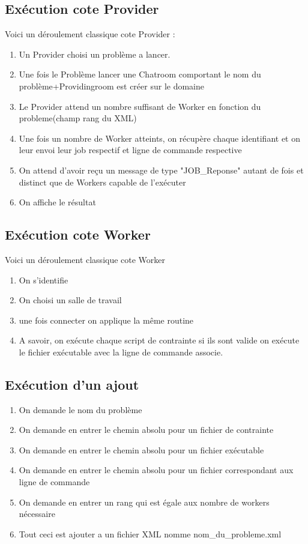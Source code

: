 \documentclass[11pt]{report}
\begin{document}
\subsection{Exécution cote Provider}
Voici un déroulement classique cote Provider :
\begin{enumerate}
\item Un Provider choisi un problème a lancer.
\item Une fois le Problème lancer une Chatroom comportant le nom du problème+Providingroom est créer sur le domaine
\item Le Provider attend un nombre suffisant de Worker en fonction du probleme(champ rang du XML)
\item Une fois un nombre de Worker atteints, on récupère chaque identifiant et on leur envoi leur job respectif et ligne de commande respective
\item On attend d'avoir reçu un message de type "JOB\_Reponse" autant de fois et distinct que de Workers capable de l’exécuter 
\item On affiche le résultat
\end{enumerate}

\subsection{Exécution cote Worker}
Voici un déroulement classique cote Worker
\begin{enumerate}
\item On s'identifie
\item On choisi un salle de travail 
\item une fois connecter on applique la même routine 
\item A savoir, on exécute chaque script de contrainte si ils sont valide on exécute le fichier exécutable avec la ligne de commande associe.
\end{enumerate}
\subsection{Exécution d'un ajout}
\begin{enumerate}
\item On demande le nom du problème 
\item On demande en entrer le chemin absolu pour un fichier de contrainte
\item On demande en entrer le chemin absolu pour un fichier exécutable
\item On demande en entrer le chemin absolu pour un fichier correspondant aux ligne de commande
\item On demande en entrer un rang qui est égale aux nombre de workers nécessaire 
\item Tout ceci est ajouter a un fichier XML nomme nom\_du\_probleme.xml
\end{enumerate}
\end{document}
